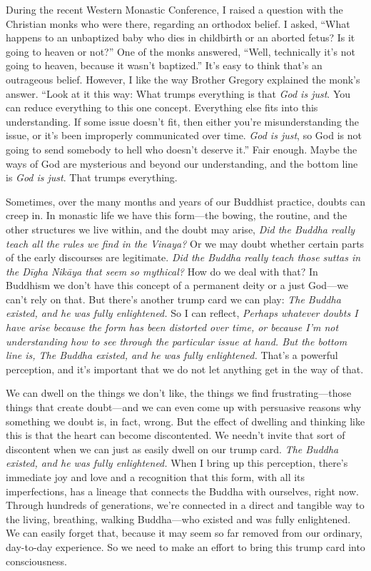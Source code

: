 During the recent Western Monastic Conference, I raised a question with 
the Christian monks who were there, regarding an orthodox belief. I 
asked, ``What happens to an unbaptized baby who dies in childbirth or 
an aborted fetus? Is it going to heaven or not?'' One of the monks 
answered, ``Well, technically it's not going to heaven, because it 
wasn't baptized.'' It's easy to think that's an outrageous belief. 
However, I like the way Brother Gregory explained the monk's answer. 
``Look at it this way: What trumps everything is that \emph{God is 
just}. You can reduce everything to this one concept. Everything else 
fits into this understanding. If some issue doesn't fit, then either 
you're misunderstanding the issue, or it's been improperly communicated 
over time. \emph{God is just}, so God is not going to send somebody to 
hell who doesn't deserve it.'' Fair enough. Maybe the ways of God are 
mysterious and beyond our understanding, and the bottom line is 
\emph{God is just}. That trumps everything.

Sometimes, over the many months and years of our Buddhist practice, 
doubts can creep in. In monastic life we have this form---the bowing, 
the routine, and the other structures we live within, and the doubt may 
arise, \emph{Did the Buddha really teach all the rules we find in the 
Vinaya?} Or we may doubt whether certain parts of the early discourses 
are legitimate. \emph{Did the Buddha really teach those suttas in the 
Dīgha Nikāya that seem so mythical?} How do we deal with that? In 
Buddhism we don't have this concept of a permanent deity or a just 
God---we can't rely on that. But there's another trump card we can 
play: \emph{The Buddha existed, and he was fully enlightened.} So I can 
reflect, \emph{Perhaps whatever doubts I have arise because the form 
has been distorted over time, or because I'm not understanding how to 
see through the particular issue at hand. But the bottom line is, The 
Buddha existed, and he was fully enlightened.} That's a powerful 
perception, and it's important that we do not let anything get in the 
way of that.

We can dwell on the things we don't like, the things we find 
frustrating---those things that create doubt---and we can even come up 
with persuasive reasons why something we doubt is, in fact, wrong. But 
the effect of dwelling and thinking like this is that the heart can 
become discontented. We needn't invite that sort of discontent when we 
can just as easily dwell on our trump card. \emph{The Buddha existed, 
and he was fully enlightened.} When I bring up this perception, there's 
immediate joy and love and a recognition that this form, with all its 
imperfections, has a lineage that connects the Buddha with ourselves, 
right now. Through hundreds of generations, we're connected in a direct 
and tangible way to the living, breathing, walking Buddha---who existed 
and was fully enlightened. We can easily forget that, because it may 
seem so far removed from our ordinary, day-to-day experience. So we 
need to make an effort to bring this trump card into consciousness.

